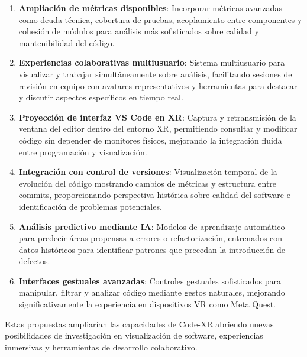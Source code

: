 \documentclass[a4paper, 12pt]{book}
\begin{document}
\begin{enumerate}
  \item \textbf{Ampliación de métricas disponibles}: Incorporar métricas avanzadas como deuda técnica, cobertura de pruebas, acoplamiento entre componentes y cohesión de módulos para análisis más sofisticados sobre calidad y mantenibilidad del código.
  
  \item \textbf{Experiencias colaborativas multiusuario}: Sistema multiusuario para visualizar y trabajar simultáneamente sobre análisis, facilitando sesiones de revisión en equipo con avatares representativos y herramientas para destacar y discutir aspectos específicos en tiempo real.

  \item \textbf{Proyección de interfaz VS Code en XR}: Captura y retransmisión de la ventana del editor dentro del entorno XR, permitiendo consultar y modificar código sin depender de monitores físicos, mejorando la integración fluida entre programación y visualización.

  \item \textbf{Integración con control de versiones}: Visualización temporal de la evolución del código mostrando cambios de métricas y estructura entre commits, proporcionando perspectiva histórica sobre calidad del software e identificación de problemas potenciales.
  
  \item \textbf{Análisis predictivo mediante IA}: Modelos de aprendizaje automático para predecir áreas propensas a errores o refactorización, entrenados con datos históricos para identificar patrones que precedan la introducción de defectos.
    
  \item \textbf{Interfaces gestuales avanzadas}: Controles gestuales sofisticados para manipular, filtrar y analizar código mediante gestos naturales, mejorando significativamente la experiencia en dispositivos VR como Meta Quest.
  \end{enumerate}

Estas propuestas ampliarían las capacidades de Code-XR abriendo nuevas posibilidades de investigación en visualización de software, experiencias inmersivas y herramientas de desarrollo colaborativo.


\end{document}
